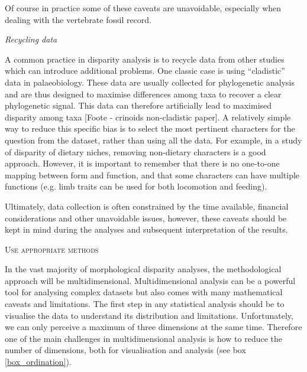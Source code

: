 \documentclass[12pt,letterpaper]{article}
\renewcommand{\section}[1]{%
\bigskip
\begin{center}
\begin{Large}
\normalfont\scshape #1
\medskip
\end{Large}
\end{center}}
\renewcommand{\subsection}[1]{%
\bigskip
\begin{center}
\begin{large}
\normalfont\itshape #1
\end{large}
\end{center}}
\begin{document}
Of course in practice some of these caveats are unavoidable, especially when dealing with the vertebrate fossil record.

\subsection{Recycling data}
A common practice in disparity analysis is to recycle data from other studies which can introduce additional problems.
One classic case is using ``cladistic'' data in palaeobiology.
These data are usually collected for phylogenetic analysis and are thus designed to maximise differences among taxa to recover a clear phylogenetic signal.
This data can therefore artificially lead to maximised disparity among taxa [Foote - crinoids non-cladistic paper].
A relatively simple way to reduce this specific bias is to select the most pertinent characters for the question from the dataset, rather than using all the data.
For example, in a study of disparity of dietary niches, removing non-dietary characters is a good approach.
However, it is important to remember that there is no one-to-one mapping between form and function, and that some characters can have multiple functions (e.g. limb traits can be used for both locomotion and feeding).

Ultimately, data collection is often constrained by the time available, financial considerations and other unavoidable issues, however, these caveats should be kept in mind during the analyses and subsequent interpretation of the results.



\section{Use appropriate methods} 
In the vast majority of morphological disparity analyses, the methodological approach will be multidimensional.
Multidimensional analysis can be a powerful tool for analysing complex datasets but also comes with many mathematical caveats and limitations.
The first step in any statistical analysis should be to visualise the data to understand its distribution and limitations.
Unfortunately, we can only perceive a maximum of three dimensions at the same time.
Therefore one of the main challenges in multidimensional analysis is how to reduce the number of dimensions, both for visualisation and analysis (see box \ref{box_ordination}).
\end{document}
